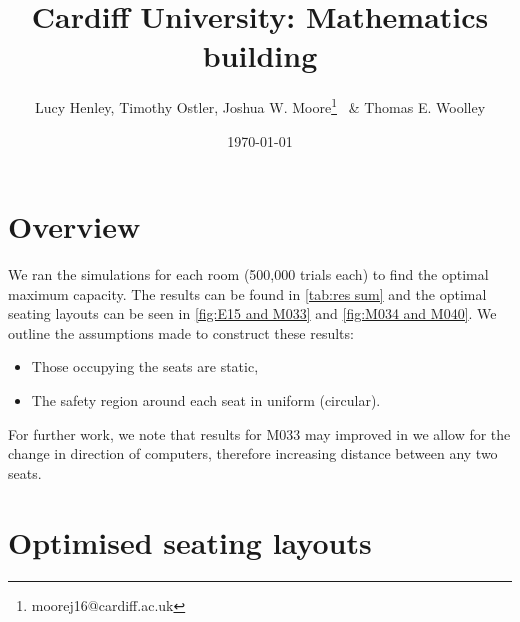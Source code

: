 \documentclass[12pt]{article}
\title{Cardiff University: Mathematics building}
\date{\today}
\author{Lucy Henley, Timothy Ostler, Joshua W. Moore\footnote{moorej16@cardiff.ac.uk} \, \& Thomas E. Woolley}
\numberwithin{equation}{section}
\begin{document}
\maketitle

\section*{Overview}
We ran the simulations for each room (500,000 trials each) to find the optimal maximum capacity. The results can be found in \autoref{tab:res sum} and the optimal seating layouts can be seen in \autoref{fig:E15 and M033} and \autoref{fig:M034 and M040}. We outline the assumptions made to construct these results:
\begin{itemize}
\item Those occupying the seats are static,
\item The safety region around each seat in uniform (circular).
\end{itemize}
For further work, we note that results for M033 may improved in we allow for the change in direction of computers, therefore increasing distance between any two seats.


\begin{table}[H]
\begin{center}
\caption{A summary of results when applying our algorithms to the fixed seat spaces in the maths building using a social distancing measure of 2 metres.}
\label{tab:res sum}
\end{center}
\end{table}


\section*{Optimised seating layouts}
\end{document}
